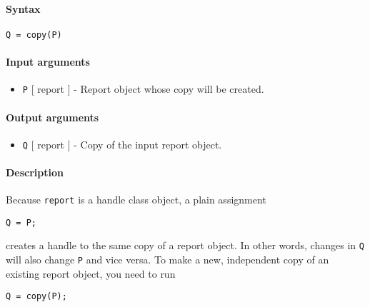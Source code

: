 


	\paragraph{Syntax}

\begin{verbatim}
Q = copy(P)
\end{verbatim}

\paragraph{Input arguments}

\begin{itemize}
\itemsep1pt\parskip0pt
\item
  \texttt{P} {[} report {]} - Report object whose copy will be created.
\end{itemize}

\paragraph{Output arguments}

\begin{itemize}
\itemsep1pt\parskip0pt
\item
  \texttt{Q} {[} report {]} - Copy of the input report object.
\end{itemize}

\paragraph{Description}

Because \texttt{report} is a handle class object, a plain assignment

\begin{verbatim}
Q = P;
\end{verbatim}

creates a handle to the same copy of a report object. In other words,
changes in \texttt{Q} will also change \texttt{P} and vice versa. To
make a new, independent copy of an existing report object, you need to
run

\begin{verbatim}
Q = copy(P);
\end{verbatim}


